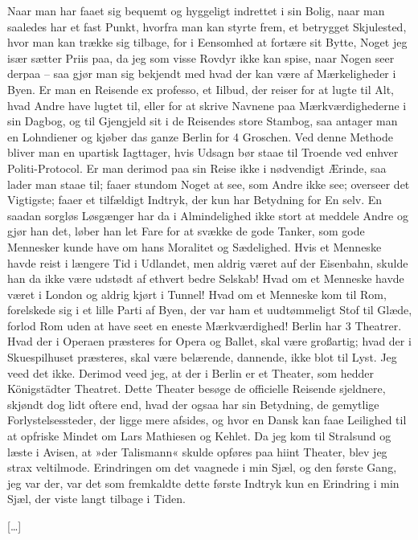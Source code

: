 \documentclass[12pt,a4paper]{article}
\begin{document}
Naar man har faaet sig bequemt og hyggeligt indrettet i sin Bolig, naar man saaledes har et fast Punkt, hvorfra man kan styrte frem, et betrygget Skjulested, hvor man kan trække sig tilbage, for i Eensomhed at fortære sit Bytte, Noget jeg især sætter Priis paa, da jeg som visse Rovdyr ikke kan spise, naar Nogen seer derpaa – saa gjør man sig bekjendt med hvad der kan være af Mærkeligheder i Byen. Er man en Reisende ex professo, et Iilbud, der reiser for at lugte til Alt, hvad Andre have lugtet til, eller for at skrive Navnene paa Mærkværdighederne i sin Dagbog, og til Gjengjeld sit i de Reisendes store Stambog, saa antager man en Lohndiener og kjøber das ganze Berlin for 4 Groschen. Ved denne Methode bliver man en upartisk Iagttager, hvis Udsagn bør staae til Troende ved enhver Politi-Protocol. Er man derimod paa sin Reise ikke i nødvendigt Ærinde, saa lader man staae til; faaer stundom Noget at see, som Andre ikke see; overseer det Vigtigste; faaer et tilfældigt Indtryk, der kun har Betydning for En selv. En saadan sorgløs Løsgænger har da i Almindelighed ikke stort at meddele Andre og gjør han det, løber han let Fare for at svække de gode Tanker, som gode Mennesker kunde have om hans Moralitet og Sædelighed. Hvis et Menneske havde reist i længere Tid i Udlandet, men aldrig været auf der Eisenbahn, skulde han da ikke være udstødt af ethvert bedre Selskab! Hvad om et Menneske havde været i London og aldrig kjørt i Tunnel! Hvad om et Menneske kom til Rom, forelskede sig i et lille Parti af Byen, der var ham et uudtømmeligt Stof til Glæde, forlod Rom uden at have seet en eneste Mærkværdighed! Berlin har 3 Theatrer. Hvad der i Operaen præsteres for Opera og Ballet, skal være großartig; hvad der i Skuespilhuset præsteres, skal være belærende, dannende, ikke blot til Lyst. Jeg veed det ikke. Derimod veed jeg, at der i Berlin er et Theater, som hedder Königstädter Theatret. Dette Theater besøge de officielle Reisende sjeldnere, skjøndt dog lidt oftere end, hvad der ogsaa har sin Betydning, de gemytlige Forlystelsessteder, der ligge mere afsides, og hvor en Dansk kan faae Leilighed til at opfriske Mindet om Lars Mathiesen og Kehlet. Da jeg kom til Stralsund og læste i Avisen, at »der Talismann« skulde opføres paa hiint Theater, blev jeg strax veltilmode. Erindringen om det vaagnede i min Sjæl, og den første Gang, jeg var der, var det som fremkaldte dette første Indtryk kun en Erindring i min Sjæl, der viste langt tilbage i Tiden.

[…]
\end{document}
